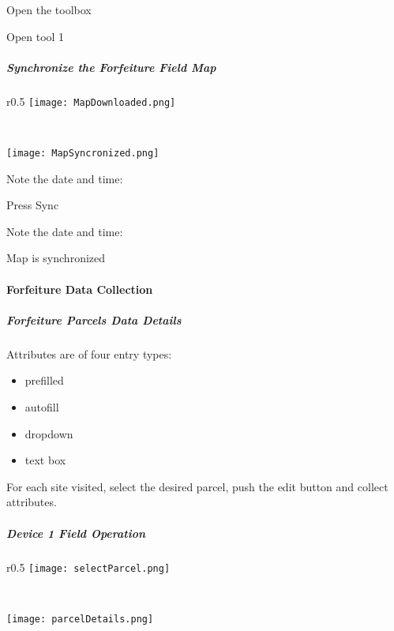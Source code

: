 \documentclass[class=book , crop=false, titlepage, twoside, multi={itemize, figure, verbatim}, float=false]{standalone}
\begin{document}
\noindent Open the toolbox
\vspace{1in}

\noindent Open tool 1
\clearpage
%
%
%
\subparagraph{Synchronize the Forfeiture Field Map}
\subparagraph*{}
%
%
\begin{wrapfigure}{r}{0.5\textwidth}
\centering
\texttt{[image: MapDownloaded.png]}
\caption{Map Downloaded}
\vspace{.25in}

\HRule \\[.4cm] %
\vspace{.25in}

\texttt{[image: MapSyncronized.png]}
\caption{Map Synchronized}
\end{wrapfigure}
\Large Note the date and time:
\vspace{1.5in}

\noindent Press \LARGE Sync
\vspace{2in}

\Large Note the date and time:
\vspace{1.25in}

{\Large Map is synchronized}
\clearpage
%
%
%
\paragraph{Forfeiture Data Collection}
\subparagraph{Forfeiture Parcels Data Details}

Attributes are of four entry types:
\begin{itemize}
\item prefilled
\item autofill
\item dropdown
\item text box
\end{itemize}
For each site visited, select the desired parcel, push the edit button and collect attributes.
\clearpage
%
%
%
\subparagraph[Device 1 Field Operation]{Device 1 Field Operation\texorpdfstring{\\}{}}
%
%
\begin{wrapfigure}{r}{0.5\textwidth}
\centering
\texttt{[image: selectParcel.png]}
\caption {Select Parcel}

\vspace{.25in}

\HRule \\[.4cm] %
\vspace{.25in}

\centering
\texttt{[image: parcelDetails.png]}
\caption{Parcel Details}
\end{wrapfigure}
\end{document}
